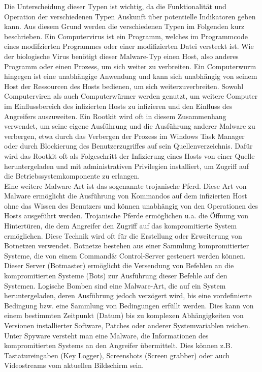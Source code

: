 Die Unterscheidung dieser Typen ist wichtig, da die Funktionalität und Operation der verschiedenen Typen Auskunft über potentielle Indikatoren geben kann. Aus diesem Grund werden die verschiedenen Typen im Folgenden kurz beschrieben. 
Ein Computervirus  ist ein Programm, welches im Programmcode eines modifzierten Programmes oder einer modifizierten Datei versteckt ist. Wie der biologische Virus benötigt dieser Malware-Typ einen Host, also anderes Programm oder einen Prozess, um sich weiter zu verbreiten. Ein Computerwurm hingegen ist eine unabhängige Anwendung und kann sich unabhängig von seinem Host der Ressourcen des Hosts bedienen, um sich weiterzuverbreiten. Sowohl Computerviren als auch Computerwürmer werden genutzt, um weitere Computer im Einflussbereich des infizierten Hosts zu infizieren und den Einfluss des Angreifers auszuweiten. 
Ein Rootkit wird oft in diesem Zusammenhang verwendet, um seine eigene Ausführung und die Ausführung anderer Malware zu verbergen, etwa durch das Verbergen der Prozess im Windows Task Manager oder durch Blockierung des Benutzerzugriffes auf sein Quellenverzeichnis. Dafür wird das Rootkit oft als Folgeschritt der Infizierung eines Hosts von einer Quelle heruntergeladen und mit administrativen Privilegien installiert, um Zugriff auf die Betriebssystemkomponente zu erlangen.\\

Eine weitere Malware-Art ist das sogenannte \glqq trojanische Pferd\grqq . Diese Art von Malware ermöglicht die Ausführung von Kommandos auf dem infizierten Host ohne das Wissen des Benutzers und können unabhängig von den Operationen des Hosts ausgeführt werden. Trojanische Pferde ermöglichen u.a. die Öffnung von Hintertüren, die dem Angreifer den Zugriff auf das kompromitierte System ermöglichen. Diese Technik wird oft für die Erstellung oder Erweiterung von Botnetzen verwendet. Botnetze bestehen aus einer Sammlung kompromitierter Systeme, die von einem \glqq Command\& Control-Server\grqq{}  gesteuert werden können. Dieser Server (Botmaster) ermöglicht die Versendung von Befehlen an die kompromitierten Systeme (Bots) zur Ausführung dieser Befehle auf den Systemen.
Logische Bomben sind eine Malware-Art, die auf ein System heruntergeladen, deren Ausführung jedoch verzögert wird, bis eine vordefinierte Bedingung bzw. eine Sammlung von Bedingungen erfüllt werden. Dies kann von einem bestimmten Zeitpunkt (Datum) bis zu komplexen Abhängigkeiten von Versionen installierter Software, Patches oder anderer Systemvariablen reichen.
Unter \glqq Spyware\grqq{} versteht man eine Malware, die Informationen des kompromitierten Systems an den Angreifer übermittelt. Dies können z.B. Tastatureingaben (Key Logger), Screenshots (Screen grabber) oder  auch Videostreams vom aktuellen Bildschirm sein\citep{Campbell2016}.

